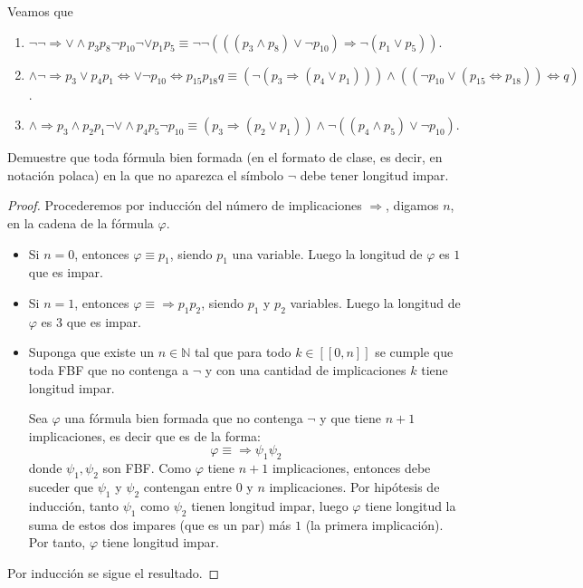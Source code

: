 \documentclass[12pt]{report}
\theoremstyle{largebreak}
\newcommand\natint[1]{\ensuremath{\left[\!\left[ #1\right]\!\right]}}
\begin{document}
    \begin{sol}
        Veamos que
        \begin{enumerate}
            \item $\neg\neg\Rightarrow\lor\land p_3p_8\neg p_{10}\neg\lor p_1p_5\equiv\neg\neg(((p_3\land p_8)\lor\neg p_{10})\Rightarrow\neg( p_1\lor p_5))$.
            \item $\land\neg\Rightarrow p_3\lor p_4p_1\iff\lor\neg p_{10}\iff p_{ 15}p_{18}q\equiv(\neg(p_3\Rightarrow(p_4\lor p_1)))\land((\neg p_{10} \lor (p_{15}\iff p_{18}))\iff q)$.
            \item $\land\Rightarrow p_3\land p_2p_1\neg\lor\land p_4p_5\neg p_{10}\equiv(p_3\Rightarrow(p_2\lor p_1))\land\neg((p_4\land p_5)\lor\neg p_10)$.
        \end{enumerate}
    \end{sol}

    \begin{excer}
        Demuestre que toda fórmula bien formada (en el formato de clase, es decir, en notación polaca) en la que no aparezca el símbolo $\neg$ debe tener longitud impar.
    \end{excer}

    \begin{proof}
        Procederemos por inducción del número de implicaciones $\Rightarrow$, digamos $n$, en la cadena de la fórmula $\varphi$.
        \begin{itemize}
            \item Si $n=0$, entonces $\varphi\equiv p_1$, siendo $p_1$ una variable. Luego la longitud de $\varphi$ es $1$ que es impar.
            \item Si $n=1$, entonces $\varphi\equiv\Rightarrow p_1p_2$, siendo $p_1$ y $p_2$ variables. Luego la longitud de $\varphi$ es $3$ que es impar.
            \item Suponga que existe un $n\in\mathbb{N}$ tal que para todo $k\in\natint{0,n}$ se cumple que toda FBF que no contenga a $\neg$ y con una cantidad de implicaciones $k$ tiene longitud impar.
            
            Sea $\varphi$ una fórmula bien formada que no contenga $\neg$ y que tiene $n+1$ implicaciones, es decir que es de la forma:
            \begin{equation*}
                \varphi \equiv\Rightarrow\psi_1\psi_2
            \end{equation*}
            donde $\psi_1,\psi_2$ son FBF. Como $\varphi$ tiene $n+1$ implicaciones, entonces debe suceder que $\psi_1$ y $\psi_2$ contengan entre $0$ y $n$ implicaciones. Por hipótesis de inducción, tanto $\psi_1$ como $\psi_2$ tienen longitud impar, luego $\varphi$ tiene longitud la suma de estos dos impares (que es un par) más $1$ (la primera implicación). Por tanto, $\varphi$ tiene longitud impar.
        \end{itemize}
        Por inducción se sigue el resultado. 
    \end{proof}
\end{document}
